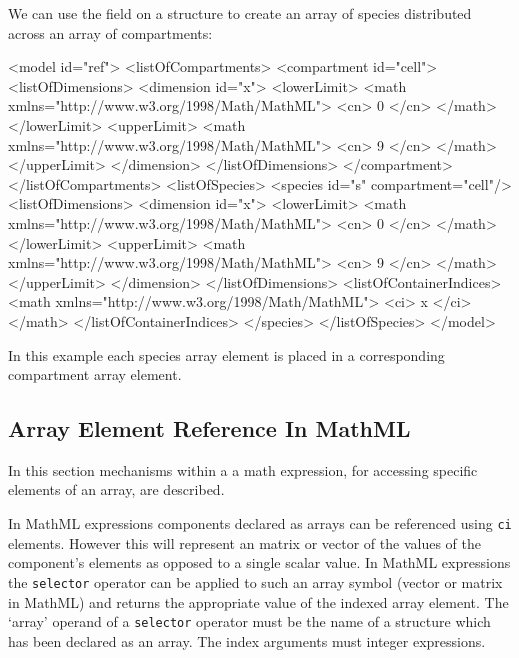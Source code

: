 \documentclass{cekarticle}
\begin{document}
We can use the  field on a  structure to create an array of species
distributed across an array of compartments:
\begin{example}
<model id="ref">
    <listOfCompartments>
        <compartment id="cell">
            <listOfDimensions>
                <dimension id="x">
                    <lowerLimit>
                        <math xmlns="http://www.w3.org/1998/Math/MathML">
                            <cn> 0 </cn>
                        </math>
                    </lowerLimit>
                    <upperLimit>
                        <math xmlns="http://www.w3.org/1998/Math/MathML">
                            <cn> 9 </cn>
                        </math>
                    </upperLimit>
                </dimension>
            </listOfDimensions>
        </compartment>
    </listOfCompartments>
    <listOfSpecies>
        <species id="s" compartment="cell"/>
            <listOfDimensions>
                <dimension id="x">
                    <lowerLimit>
                        <math xmlns="http://www.w3.org/1998/Math/MathML">
                            <cn> 0 </cn>
                        </math>
                    </lowerLimit>
                    <upperLimit>
                        <math xmlns="http://www.w3.org/1998/Math/MathML">
                            <cn> 9 </cn>
                        </math>
                    </upperLimit>
                </dimension>
            </listOfDimensions>
            <listOfContainerIndices>
                <math xmlns="http://www.w3.org/1998/Math/MathML">
                    <ci> x </ci>
                </math>
            </listOfContainerIndices>
        </species>
    </listOfSpecies>
</model>
\end{example}
In this example each species array element is placed in a
corresponding compartment array element.

\subsection{Array Element Reference In MathML}
In this section mechanisms within a a math expression, for accessing specific elements of an
array, are described.

In MathML expressions components declared as arrays can be referenced using \texttt{ci} elements.
However this will represent an matrix or vector of the values of the component's elements as opposed
to a single scalar value.
In MathML expressions the \texttt{selector} operator
can be applied to such an array symbol (vector or matrix in MathML) and
returns the appropriate value of the indexed array element.
The `array' operand of a \texttt{selector} operator must be the name of a
structure which has been declared as an array.  The index arguments must integer expressions.
\end{document}
